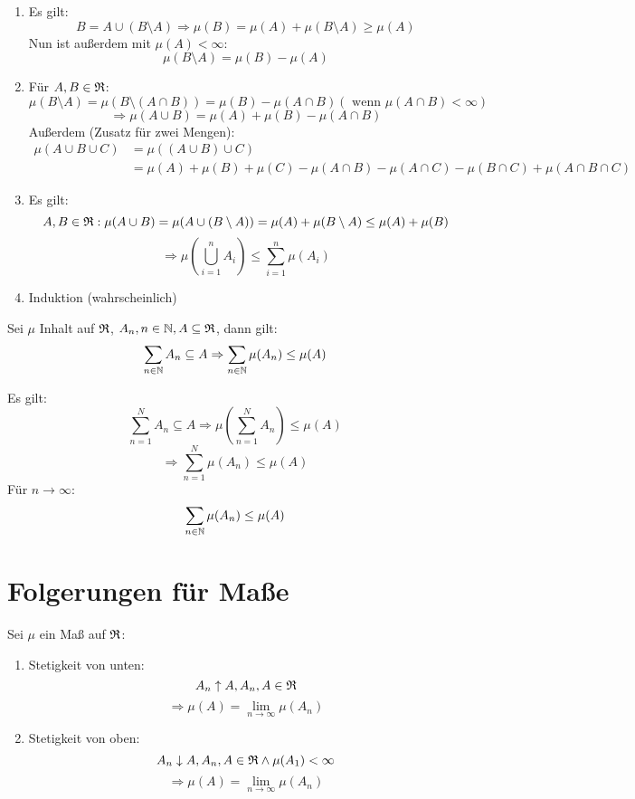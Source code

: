 		\begin{bew}
			\begin{enumerate}
				\item Es gilt:
				\[ B=A\cup (B\setminus A)\Rightarrow \mu(B)=\mu(A)+\mu(B\setminus A)\ge \mu(A) \]
				Nun ist außerdem mit $\mu(A)<\infty$:
				\[ \mu(B\setminus A)=\mu(B)-\mu(A) \]
				\item
				Für $A,B\in\mathfrak{R}$:
				\[ \mu(B\setminus A)=\mu(B\setminus (A\cap B))=\mu(B)-\mu(A\cap B) (\text{ wenn }\mu(A\cap B)<\infty) \]
				\[ \Rightarrow \mu(A\cup B)=\mu(A)+\mu(B)-\mu(A\cap B) \]
				Außerdem (Zusatz für zwei Mengen):
				\begin{align*} \mu(A\cup B\cup C)&=\mu((A\cup B)\cup C)\\&=\mu(A)+\mu(B)+\mu(C)-\mu(A\cap B)-\mu(A\cap C)-\mu(B\cap C)+\mu(A\cap B\cap C) \end{align*}
				\item Es gilt:
				\[ A,B\in\mathfrak{R}: \mu(A\cup B)=\mu(A\cup (B\setminus A))=\mu(A)+\mu(B\setminus A)\le \mu(A)+\mu(B) \]
				\[ \Rightarrow \mu\left(\bigcup_{i=1}^n A_i\right)\le \sum_{i=1}^n \mu(A_i) \]
				\item Induktion (wahrscheinlich)
			\end{enumerate}
		\end{bew}
		\begin{satz}
			Sei $\mu$ Inhalt auf $\mathfrak{R}$, $A_n, n\in\mathbb{N}, A\subseteq\mathfrak{R}$, dann gilt:
			\[ \sum_{n\in\mathbb{N}} A_n\subseteq A\Rightarrow \sum_{n\in\mathbb{N}}\mu(A_n)\le \mu(A) \]
		\end{satz}
		\begin{bew}
			Es gilt:
			\[ \sum_{n=1}^N A_n\subseteq A\Rightarrow \mu\left(\sum_{n=1}^N A_n\right) \le \mu(A) \]
			\[ \Rightarrow \sum_{n=1}^N \mu(A_n)\le \mu(A) \]
			Für $n\to\infty$:
			\[ \sum_{n\in\mathbb{N}} \mu(A_n)\le \mu(A) \]
		\end{bew}
		
		\section{Folgerungen für Maße}
		
		\begin{satz}
			Sei $\mu$ ein Maß auf $\mathfrak{R}$:
			\begin{enumerate}
				\item Stetigkeit von unten:
				\[ A_n\uparrow A, A_n, A\in\mathfrak{R} \]
				\[ \Rightarrow \mu(A)=\lim_{n\to\infty} \mu(A_n) \]
				\item Stetigkeit von oben:
				\[ A_n\downarrow A, A_n, A\in\mathfrak{R}\land \mu(A_1)<\infty \]
				\[ \Rightarrow \mu(A)=\lim_{n\to\infty} \mu(A_n) \]
			\end{enumerate}
		\end{satz}
			
